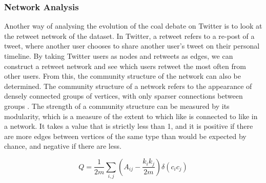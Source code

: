 \documentclass[12pt,onecolumn,twoside]{layout}
\begin{document}
\subsubsection*{Network Analysis}
Another way of analysing the evolution of the coal debate on Twitter is to look at the retweet network of the dataset. In Twitter, a retweet refers to a re-post of a tweet, where another user chooses to share another user's tweet on their personal timeline. By taking Twitter users as nodes and retweets as edges, we can construct a retweet network and see which users retweet the most often from other users. From this, the community structure of the network can also be determined. The community structure of a network refers to the appearance of densely connected groups of vertices, with only sparser connections between groups \cite{Newman8577}. The strength of a community structure can be measured by its modularity, which is a measure of the extent to which like is connected to like in a network. It takes a value that is strictly less than 1, and it is positive if there are more edges between vertices of the same type than would be expected by chance, and negative if there are less. %

\begin{equation}
\label{eq:modularity}
Q = \frac{1}{2m} \sum_{i,j} \left(A_{ij} - \frac{k_i k_j} {2m}\right) \delta (c_i c_j)
\end{equation} 	
\end{document}
